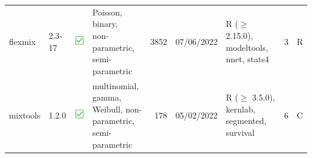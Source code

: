 \begin{table}[!h]
{\begin{tabular}[t]{llllrllrl}
flexmix & 2.3-17 & \includegraphics[scale=0.05]{figures/green_tick.png}& \makecell[c]{Poisson, binary,\\non-parametric,\\semi-parametric} & 3852 & 07/06/2022 & \makecell[c]{R ($\ge$ 2.15.0), modeltools,\\nnet, stats4} & 3 & R\\
mixtools & 1.2.0 & \includegraphics[scale=0.05]{figures/green_tick.png}& \makecell[r]{multinomial, gamma,\\Weibull, non-parametric,\\semi-parametric} & 178 & 05/02/2022 & \makecell[r]{R ($\ge$ 3.5.0), kernlab,\\segmented, survival} & 6 & C\\

\end{tabular}}
\end{table}

